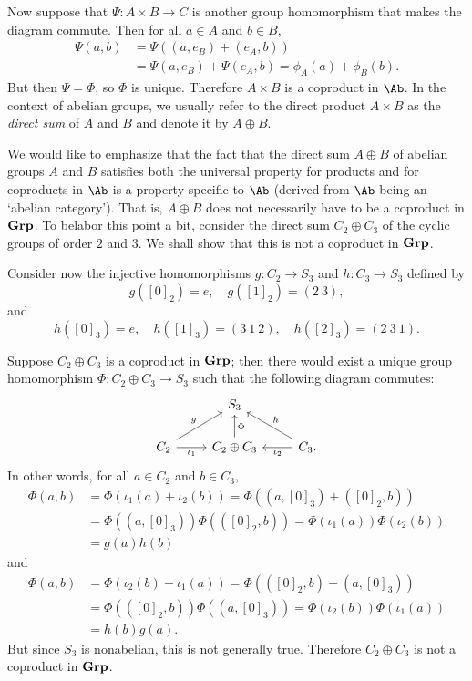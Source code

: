 Now suppose that \(\Psi : A \times B \to C\) is another group homomorphism that
makes the diagram commute. Then for all \(a \in A\) and \(b \in B\),
\begin{align*}
    \Psi(a, b) &= \Psi((a, e_B) + (e_A, b)) \\&= \Psi(a, e_B) + \Psi(e_A, b) = \phi_A(a) + \phi_B(b).
\end{align*}
But then \(\Psi = \Phi\), so \(\Phi\) is unique. Therefore \(A \times B\) is a
coproduct in \(\Ab\). In the context of abelian groups, we usually refer to the
direct product \(A \times B\) as the \emph{direct sum} of \(A\) and \(B\) and
denote it by \(A \oplus B\).

\begin{example}
    We would like to emphasize that the fact that the direct sum \(A \oplus B\)
    of abelian groups \(A\) and \(B\) satisfies both the universal property for
    products and for coproducts in \(\Ab\) is a property specific to \(\Ab\)
    (derived from \(\Ab\) being an `abelian category'). That is, \(A \oplus B\)
    does not necessarily have to be a coproduct in \(\mathbf{Grp}\). To belabor this
    point a bit, consider the direct sum \(C_2 \oplus C_3\) of the cyclic groups
    of order \(2\) and \(3\). We shall show that this is not a coproduct in
    \(\mathbf{Grp}\).

    Consider now the injective homomorphisms \(g: C_2 \to S_3\) and \(h: C_3 \to
    S_3\) defined by
    \[
        g([0]_2) = e, \quad g([1]_2) = (2\ 3),
    \]
    and
    \[
        h([0]_3) = e, \quad h([1]_3) = (3\ 1\ 2), \quad h([2]_3) = (2\ 3\ 1).
    \]

    Suppose \(C_2 \oplus C_3\) is a coproduct in \(\mathbf{Grp}\); then there would
    exist a unique group homomorphism \(\Phi: C_2 \oplus C_3 \to S_3\) such that
    the following diagram commutes:
    \[
        \begin{tikzcd}
            & S_3 & \\
            C_2 \arrow[ur, "g"] \arrow[r, "\iota_1"'] & C_2 \oplus C_3 \arrow[u, "\Phi"'] & C_3 \arrow[ul, "h"'] \arrow[l, "\iota_2"].
        \end{tikzcd}
    \]
    In other words, for all \(a \in C_2\) and \(b \in C_3\),
    \begin{align*}
        \Phi(a,b) &= \Phi(\iota_1(a) + \iota_2(b)) = \Phi((a, [0]_3) + ([0]_2, b))\\
        &= \Phi((a, [0]_3)) \Phi(([0]_2, b)) = \Phi(\iota_1(a))\Phi(\iota_2(b)) \\&= g(a)h(b)
    \end{align*}
    and
    \begin{align*}
        \Phi(a, b) &= \Phi(\iota_2(b) + \iota_1(a)) = \Phi(([0]_2, b) + (a, [0]_3))\\
        &= \Phi(([0]_2, b))\Phi((a, [0]_3)) = \Phi(\iota_2(b))\Phi(\iota_1(a)) \\&= h(b)g(a).
    \end{align*}
    But since \(S_3\) is nonabelian, this is not generally true. Therefore \(C_2
    \oplus C_3\) is not a coproduct in \(\mathbf{Grp}\).
\end{example}


